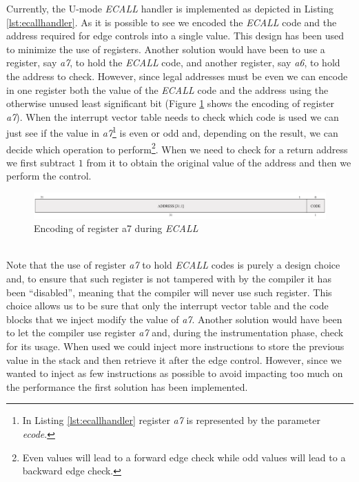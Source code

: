 Currently, the U-mode \textit{ECALL} handler is implemented as depicted in Listing
\ref{lst:ecallhandler}. As it is possible to see we encoded the \textit{ECALL} code
and the address required for edge controls into a single value. This design has
been used to minimize the use of registers. Another solution would have been to use
a register, say \textit{a7}, to hold the \textit{ECALL} code, and another
register, say \textit{a6}, to hold the address to check. However, since legal addresses
must be even we can encode in one register both the value of the \textit{ECALL}
code and the address using the otherwise unused least significant bit (Figure \ref{fig:ecall}
shows the encoding of register \textit{a7}). When the interrupt vector table
needs to check which code is used we can just see if the value in \textit{a7}\footnote{In
Listing \ref{lst:ecallhandler} register \textit{a7} is represented by the parameter
\textit{ecode}.} is even or odd and, depending on the result, we can decide
which operation to perform\footnote{Even values will lead to a forward edge
check while odd values will lead to a backward edge check.}. When we need to
check for a return address we first subtract $1$ from it to obtain the original
value of the address and then we perform the control. \\
\begin{figure}[htbp]
  \centering
  \includegraphics[width=.9\linewidth]{images/ecall_code.png}
  \caption{Encoding of register a7 during \textit{ECALL}}
  \label{fig:ecall}
\end{figure}
\\

Note that the use of register \textit{a7} to hold \textit{ECALL} codes is purely
a design choice and, to ensure that such register is not tampered with by the compiler
it has been ``disabled'', meaning that the compiler will never use such register.
This choice allows us to be sure that only the interrupt vector table and the code
blocks that we inject modify the value of \textit{a7}. Another solution would have
been to let the compiler use register \textit{a7} and, during the instrumentation
phase, check for its usage. When used we could inject more instructions to store
the previous value in the stack and then retrieve it after the edge control.
However, since we wanted to inject as few instructions as possible to avoid impacting
too much on the performance the first solution has been implemented.

